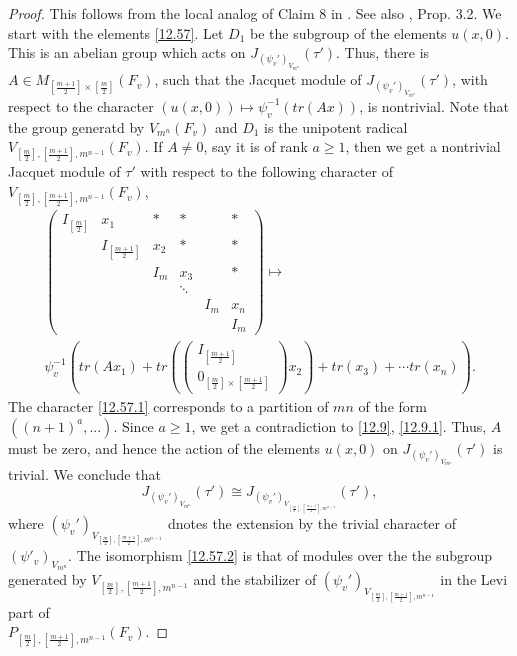 \documentclass[12pts]{amsart}
\begin{document}
\begin{proof}
This follows from the local analog of Claim 8 in \cite{CFGK17}. See also \cite{GS18}, Prop. 3.2. We start with the elements \eqref{12.57}. Let $D_1$ be the subgroup of the elements $u(x,0)$. This is an abelian group which acts on $J_{(\psi_v')_{V_{m^n}}}(\tau')$. Thus, there is $A\in M_{[\frac{m+1}{2}]\times [\frac{m}{2}]}(F_v)$, such that the Jacquet module of $J_{(\psi_v')_{V_{m^n}}}(\tau')$, with respect to the character   $(u(x,0))\mapsto\psi_v^{-1}(tr(Ax))$, is nontrivial. Note that the group generatd by $V_{m^n}(F_v)$ and $D_1$ is the unipotent radical $V_{[\frac{m}{2}],[\frac{m+1}{2}],m^{n-1}}(F_v)$. If $A\neq 0$, say it is of rank $a\geq 1$, then we get a nontrivial Jacquet module of $\tau'$ with respect to the following character of $V_{[\frac{m}{2}],[\frac{m+1}{2}],m^{n-1}}(F_v)$,
\begin{multline}\label{12.57.1}
\begin{pmatrix}I_{[\frac{m}{2}]}&x_1&\ast&\ast&&\ast\\
&I_{[\frac{m+1}{2}]}&x_2&\ast&&\ast\\&&I_m&x_3&&\ast\\&&&\ddots\\&&&&I_m&x_n\\&&&&&I_m\end{pmatrix}\mapsto\\ \psi^{-1}_v(tr(Ax_1)+tr(\begin{pmatrix}I_{[\frac{m+1}{2}]}\\0_{[\frac{m}{2}]\times [\frac{m+1}{2}]}\end{pmatrix}x_2)+tr(x_3)+\cdots tr(x_n)).
\end{multline}
The character \eqref{12.57.1} corresponds to a partition of $mn$ of the form $((n+1)^a,...)$. Since $a\geq 1$, we get a contradiction to \eqref{12.9}, \eqref{12.9.1}. Thus, $A$ must be zero, and hence the action of the elements $u(x,0)$ on $J_{(\psi_v')_{V_{m^n}}}(\tau')$ is trivial. We conclude that
\begin{equation}\label{12.57.2}
J_{(\psi_v')_{V_{m^n}}}(\tau')\cong J_{(\psi_v')_{V_{[\frac{m}{2}],[\frac{m+1}{2}],m^{n-1}}}}(\tau'),
\end{equation}
where $(\psi_v')_{V_{[\frac{m}{2}],[\frac{m+1}{2}],m^{n-1}}}$ dnotes the extension by the trivial character of $(\psi'_v)_{V_{m^n}}$. The isomorphism \eqref{12.57.2} is that of modules over the the subgroup generated by $V_{[\frac{m}{2}],[\frac{m+1}{2}],m^{n-1}}$ and the stabilizer of $(\psi_v')_{V_{[\frac{m}{2}],[\frac{m+1}{2}],m^{n-1}}}$ in the Levi part of\\ $P_{[\frac{m}{2}],[\frac{m+1}{2}],m^{n-1}}(F_v)$.

\end{proof}
\end{document}
